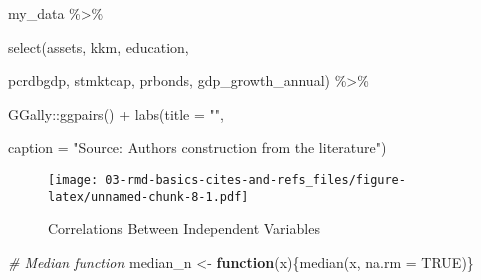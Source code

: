 \documentclass[a4paper,nobind]{templates/ociamthesis}
\newenvironment{Shaded}{\begin{snugshade}}{\end{snugshade}}
\newcommand{\AttributeTok}[1]{\textcolor[rgb]{0.77,0.63,0.00}{#1}}
\newcommand{\CommentTok}[1]{\textcolor[rgb]{0.56,0.35,0.01}{\textit{#1}}}
\newcommand{\ConstantTok}[1]{\textcolor[rgb]{0.00,0.00,0.00}{#1}}
\newcommand{\ControlFlowTok}[1]{\textcolor[rgb]{0.13,0.29,0.53}{\textbf{#1}}}
\newcommand{\FunctionTok}[1]{\textcolor[rgb]{0.00,0.00,0.00}{#1}}
\newcommand{\NormalTok}[1]{#1}
\newcommand{\OtherTok}[1]{\textcolor[rgb]{0.56,0.35,0.01}{#1}}
\newcommand{\SpecialCharTok}[1]{\textcolor[rgb]{0.00,0.00,0.00}{#1}}
\newcommand{\StringTok}[1]{\textcolor[rgb]{0.31,0.60,0.02}{#1}}
\renewenvironment{Shaded}
{
  \vspace{10pt}%
  \begin{snugshade}%
}{%
  \end{snugshade}%
  \vspace{8pt}%
}
\begin{document}
\begin{landscape}

\begin{Shaded}
\begin{Highlighting}[]
\NormalTok{my\_data }\SpecialCharTok{\%\textgreater{}\%}
  
  \FunctionTok{select}\NormalTok{(assets, kkm, education, }
         
\NormalTok{         pcrdbgdp, stmktcap, prbonds, gdp\_growth\_annual) }\SpecialCharTok{\%\textgreater{}\%} 
  
\NormalTok{         GGally}\SpecialCharTok{::}\FunctionTok{ggpairs}\NormalTok{() }\SpecialCharTok{+} \FunctionTok{labs}\NormalTok{(}\AttributeTok{title =} \StringTok{""}\NormalTok{, }
                                  
                                  \AttributeTok{caption =} \StringTok{"Source: Authors\textquotesingle{} construction from the literature"}\NormalTok{)}
\end{Highlighting}
\end{Shaded}

\begin{figure}
\centering
\texttt{[image: 03-rmd-basics-cites-and-refs\_files/figure-latex/unnamed-chunk-8-1.pdf]}
\caption{\label{fig:unnamed-chunk-8}Correlations Between Independent Variables}
\end{figure}

\begin{Shaded}
\begin{Highlighting}[]
\CommentTok{\# Median function}
\NormalTok{median\_n }\OtherTok{\textless{}{-}} \ControlFlowTok{function}\NormalTok{(x)\{}\FunctionTok{median}\NormalTok{(x, }\AttributeTok{na.rm =} \ConstantTok{TRUE}\NormalTok{)\}}
\end{Highlighting}
\end{Shaded}


\end{landscape}
\end{document}
